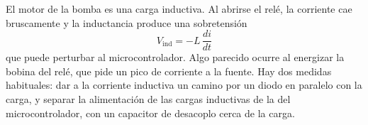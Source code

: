 El motor de la bomba es una carga inductiva. Al abrirse el relé, la corriente cae bruscamente y la inductancia produce una sobretensión
\begin{equation}
    V_{\text{ind}} = -L\,\frac{di}{dt}
\end{equation}
que puede perturbar al microcontrolador. Algo parecido ocurre al energizar la bobina del relé, que pide un pico de corriente a la fuente. Hay dos medidas habituales: dar a la corriente inductiva un camino por un diodo en paralelo con la carga, y separar la alimentación de las cargas inductivas de la del microcontrolador, con un capacitor de desacoplo cerca de la carga.
